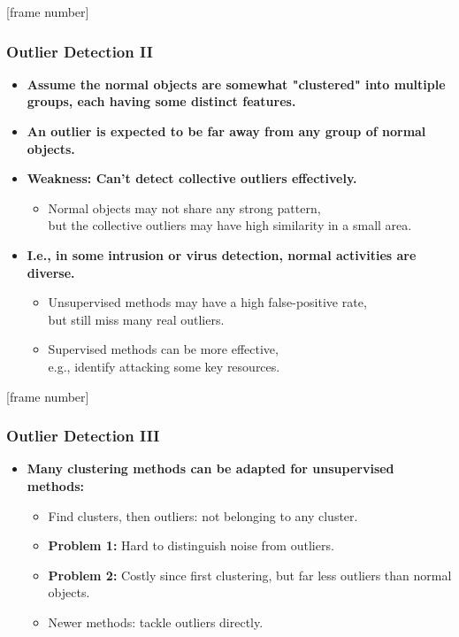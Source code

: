 \documentclass[aspectratio=169,t,xcolor=dvipsnames]{beamer}
\begin{document}
{
[frame number]
\begin{frame}
	\frametitle{Outlier Detection II}
	\begin{itemize}
		\item \textbf{Assume the {\color{airforceblue}normal objects are somewhat "clustered"} into multiple groups, each having some distinct features.}
		\item\textbf{An outlier is expected to be {\color{airforceblue}far away from any group} of normal objects.}
		\item \textbf{Weakness: Can't detect collective outliers effectively.}
		      \begin{itemize}
		      	\item Normal objects may not share any strong pattern, \\
            but the collective outliers may have high similarity in a small area.
		      \end{itemize}
		\item \textbf{I.e., in some intrusion or virus detection, normal activities are diverse.}
		      \begin{itemize}
		      	\item Unsupervised methods may have a high false-positive rate, \\
            but still miss many real outliers.
		      	\item Supervised methods can be more effective, \\
            e.g., identify attacking some key resources.
		      \end{itemize}
	\end{itemize}
\end{frame}
}

{
[frame number]
\begin{frame}
	\frametitle{Outlier Detection III}
	\begin{itemize}
		\item \textbf{Many clustering methods can be adapted for unsupervised methods:}
		      \begin{itemize}
		      	\item Find clusters, then outliers: not belonging to any cluster.
		      	\item \textbf{Problem 1:} Hard to distinguish noise from outliers.
		      	\item \textbf{Problem 2:} Costly since first clustering, but far less outliers than normal objects.
		      	\item Newer methods: tackle outliers directly.
		      \end{itemize}
	\end{itemize}
\end{frame}
}
\end{document}
